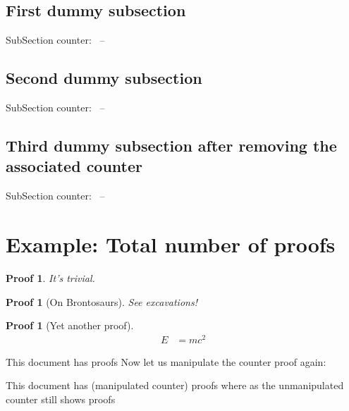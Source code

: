\documentclass[12pt,paper=a4]{ltxdoc}
\begin{document}

\begin{dispExample}
%
%
%

\subsection{First dummy subsection}
SubSection counter: \thesubsection~-- \number{}
\subsection{Second dummy subsection}
SubSection counter: \thesubsection~-- \number{}

%
\subsection{Third dummy subsection after removing the associated counter}

SubSection counter: \thesubsection~-- \number{}

\end{dispExample}

\section[Total number of proofs]{Example: Total number of proofs}


\begin{dispExample}
%
%
\newtheorem{Proof}[proof]{Proof}%
\begin{Proof}
It's trivial.   
\end{Proof}

\begin{Proof}[On Brontosaurs]
See excavations!
\end{Proof}

\setcounter{proof}{17}

\begin{Proof}[Yet another proof]
\begin{align*}
  E &= m c^2
  \end{align*}
\end{Proof}

This document has \number\value{anotherproofcounter} proofs %
Now let us manipulate the counter proof again:
\setcounter[AssociatedCounters={totalproofs}]{proof}{200}

This document has \number{} (manipulated counter) proofs where as the unmanipulated counter still shows \number\value{anotherproofcounter} proofs %
\end{dispExample}
\end{document}
